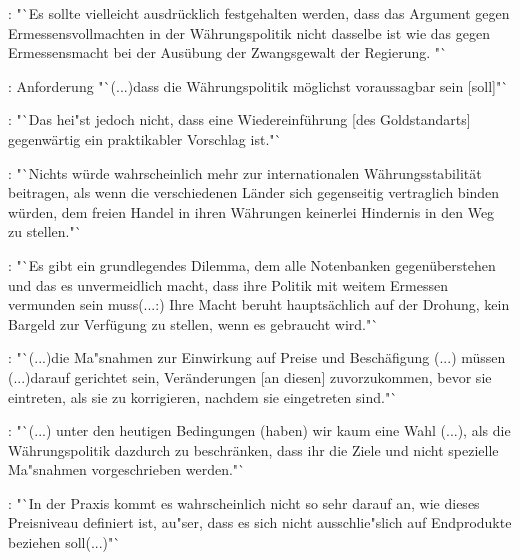 \documentclass[
    onecolumn,
    a4paper,
    abstracton,
    parskip=half
    ,final
    ]{scrartcl}
\begin{document}
\citep[vgl.][S.420]{hayek1971die}: "`Es sollte vielleicht ausdr{\"u}cklich festgehalten werden, dass das Argument gegen Ermessensvollmachten in der W{\"a}hrungspolitik nicht dasselbe ist wie das gegen Ermessensmacht bei der Aus{\"u}bung der Zwangsgewalt der Regierung. "`

\citep[vgl.][S.420]{hayek1971die}: Anforderung "`(...)dass die W{\"a}hrungspolitik m{\"o}glichst voraussagbar sein [soll]"`

\citep[vgl.][S.421]{hayek1971die}: "`Das hei{"s}t jedoch nicht, dass eine Wiedereinf{\"u}hrung [des Goldstandarts] gegenw{\"a}rtig ein praktikabler Vorschlag ist."`

\citep[vgl.][S.421]{hayek1971die}: "`Nichts w{\"u}rde wahrscheinlich mehr zur internationalen W{\"a}hrungsstabilit{\"a}t beitragen, als wenn die verschiedenen L{\"a}nder sich gegenseitig vertraglich binden w{\"u}rden, dem freien Handel in ihren W{\"a}hrungen keinerlei Hindernis in den Weg zu stellen."`

\citep[vgl.][S.422]{hayek1971die}: "`Es gibt ein grundlegendes Dilemma, dem alle Notenbanken gegen{\"u}berstehen und das es unvermeidlich macht, dass ihre Politik mit weitem Ermessen vermunden sein muss(...:) Ihre Macht beruht haupts{\"a}chlich auf der Drohung, kein Bargeld zur Verf{\"u}gung zu stellen, wenn es gebraucht wird."`

\citep[vgl.][S.422]{hayek1971die}: "`(...)die Ma{"s}nahmen zur Einwirkung auf Preise und Besch{\"a}figung (...) m{\"u}ssen (...)darauf gerichtet sein, Ver{\"a}nderungen [an diesen] zuvorzukommen, bevor sie eintreten, als sie zu korrigieren, nachdem sie eingetreten sind."`

\citep[vgl.][S.423]{hayek1971die}: "`(...) unter den heutigen Bedingungen (haben) wir kaum eine Wahl (...), als die W{\"a}hrungspolitik dazdurch zu beschr{\"a}nken, dass ihr die Ziele und nicht spezielle Ma{"s}nahmen vorgeschrieben werden."`

\citep[vgl.][S.423]{hayek1971die}: "`In der Praxis kommt es wahrscheinlich nicht so sehr darauf an, wie dieses Preisniveau definiert ist, au{"s}er, dass es sich nicht ausschlie{"s}lich auf Endprodukte beziehen soll(...)"`
\end{document}
